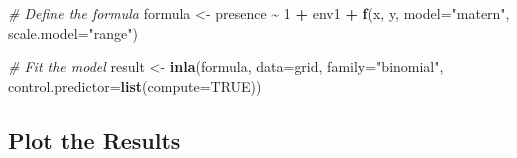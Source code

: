 \documentclass[
]{krantz}
\newenvironment{Shaded}{\begin{snugshade}}{\end{snugshade}}
\newcommand{\AttributeTok}[1]{\textcolor[rgb]{0.27,0.27,0.27}{#1}}
\newcommand{\CommentTok}[1]{\textcolor[rgb]{0.37,0.37,0.37}{\textit{#1}}}
\newcommand{\ConstantTok}[1]{\textcolor[rgb]{0.37,0.37,0.37}{#1}}
\newcommand{\DecValTok}[1]{\textcolor[rgb]{0.06,0.06,0.06}{#1}}
\newcommand{\FunctionTok}[1]{\textcolor[rgb]{0.27,0.27,0.27}{\textbf{#1}}}
\newcommand{\NormalTok}[1]{#1}
\newcommand{\OtherTok}[1]{\textcolor[rgb]{0.37,0.37,0.37}{#1}}
\newcommand{\SpecialCharTok}[1]{\textcolor[rgb]{0.43,0.43,0.43}{\textbf{#1}}}
\newcommand{\StringTok}[1]{\textcolor[rgb]{0.5,0.5,0.5}{#1}}
\begin{document}
\begin{Shaded}
\begin{Highlighting}[]
\CommentTok{\# Define the formula}
\NormalTok{formula }\OtherTok{\textless{}{-}}\NormalTok{ presence }\SpecialCharTok{\textasciitilde{}} \DecValTok{1} \SpecialCharTok{+}\NormalTok{ env1 }\SpecialCharTok{+} \FunctionTok{f}\NormalTok{(x, y, }\AttributeTok{model=}\StringTok{"matern"}\NormalTok{, }\AttributeTok{scale.model=}\StringTok{"range"}\NormalTok{)}

\CommentTok{\# Fit the model}
\NormalTok{result }\OtherTok{\textless{}{-}} \FunctionTok{inla}\NormalTok{(formula, }\AttributeTok{data=}\NormalTok{grid, }\AttributeTok{family=}\StringTok{"binomial"}\NormalTok{, }\AttributeTok{control.predictor=}\FunctionTok{list}\NormalTok{(}\AttributeTok{compute=}\ConstantTok{TRUE}\NormalTok{))}
\end{Highlighting}
\end{Shaded}

\hypertarget{plot-the-results}{%
\subsection{Plot the Results}\label{plot-the-results}}
\end{document}
